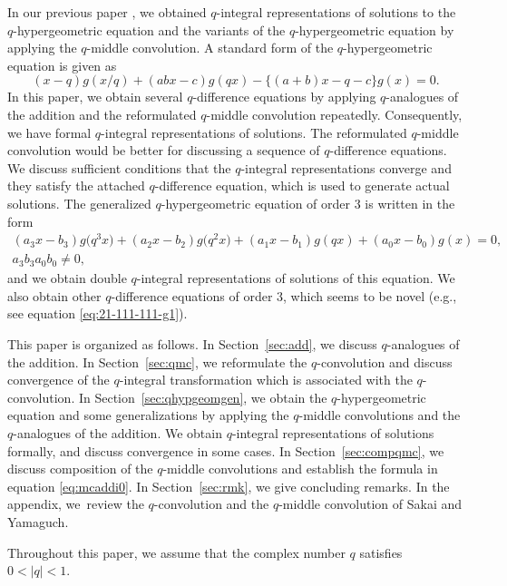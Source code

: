 \documentclass[pdftex]{sigma}
\numberwithin{equation}{section}
\theoremstyle{definition}
\begin{document}
In our previous paper \cite{AT}, we obtained $q$-integral representations of solutions to the $q$-hypergeometric equation and the variants of the $q$-hypergeometric equation by applying the $q$-middle convolution.
A standard form of the $q$-hypergeometric equation is given as
\begin{equation} \label{eq:qhg-sta-sngl}
(x-q)g(x/q)+(abx-c)g(qx)-\{(a+b)x-q-c \}g(x)=0.
\end{equation}
In this paper, we obtain several $q$-difference equations by applying $q$-analogues of the addition and the reformulated $q$-middle convolution repeatedly.
Consequently, we have formal $q$-integral representations of solutions.
The reformulated $q$-middle convolution would be better for discussing a sequence of $q$-difference equations.
We discuss sufficient conditions that the $q$-integral representations converge and they satisfy the attached $q$-difference equation, which is used to generate actual solutions.
The generalized $q$-hypergeometric equation of order $3$ is written in the form
\begin{gather*}
(a_3 x-b_3)g\bigl(q ^3 x\bigr) + (a_2 x-b_2)g\bigl(q ^2 x\bigr) +(a_1 x-b_1)g(q x) + (a_0 x-b_0)g( x) =0,\\ a_3 b_3 a_0 b_0 \neq 0,
\end{gather*}
and we obtain double $q$-integral representations of solutions of this equation.
We also obtain other $q$-difference equations of order $3$, which seems to be novel (e.g., see equation \eqref{eq:21-111-111-g1}).

This paper is organized as follows.
In Section~\ref{sec:add}, we discuss $q$-analogues of the addition.
In Section~\ref{sec:qmc}, we reformulate the $q$-convolution and discuss convergence of the $q$-integral transformation which is associated with the $q$-convolution.
In Section~\ref{sec:qhypgeomgen}, we obtain the $q$-hypergeometric equation and some generalizations by applying the $q$-middle convolutions and the $q$-analogues of the addition.
We obtain $q$-integral representations of solutions formally, and discuss convergence in some cases.
In Section~\ref{sec:compqmc}, we discuss composition of the $q$-middle convolutions and establish the formula in equation \eqref{eq:mcaddi0}.
In Section~\ref{sec:rmk}, we give concluding remarks.
In the appendix, we~review the $q$-convolution and the $q$-middle convolution of Sakai and Yamaguch.

Throughout this paper, we assume that the complex number $q$ satisfies $0 <|q|<1$.
\end{document}
